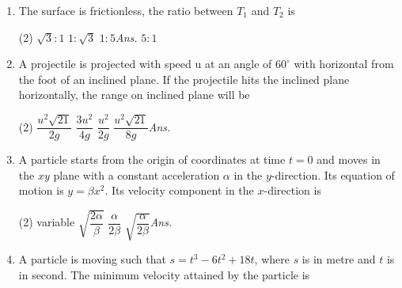\documentclass{article}
\newcommand{\ans}{\textcolor{red!95}{\textit{\quad Ans.}}}
\begin{document}
\begin{enumerate}
\item The surface is frictionless, the ratio between $T_1$ and $T_2$ is
\begin{center}
\end{center}	
\begin{tasks}(2)
	\task $\sqrt{3}:1$
	\task $1:\sqrt{3}$
	\task $1:5$\ans
	\task $5:1$
\end{tasks}



\item A projectile is projected with speed u at an angle of $60^\circ$ with horizontal from the foot of an inclined plane. If the projectile hits the inclined plane horizontally, the range on inclined plane will be
\begin{tasks}(2)
	\task $\dfrac{u^2\sqrt{21}}{2g}$
	\task $\dfrac{3u^2}{4g}$
	\task $\dfrac{u^2}{2g}$
	\task $\dfrac{u^2\sqrt{21}}{8g}$\ans
\end{tasks}
            
            
\item A particle starts from the origin of coordinates at time $t = 0$ and moves in the $xy$ plane with a constant acceleration $\alpha$ in the $y$-direction. Its equation of motion is $y = \beta x^2$. Its velocity
component in the $x$-direction is  
\begin{tasks}(2)
	\task variable
	\task $\sqrt{\dfrac{2\alpha}{\beta}}$
	\task $\dfrac{\alpha}{2\beta}$
	\task $\sqrt{\dfrac{\alpha}{2\beta}}$\ans
\end{tasks}   

\item A particle is moving such that $s=t^3-6t^2+18t$, where $s$ is in metre and $t$ is in second. The minimum velocity attained by the particle is
\begin{center}
\end{center}
\end{enumerate}
\end{document}
